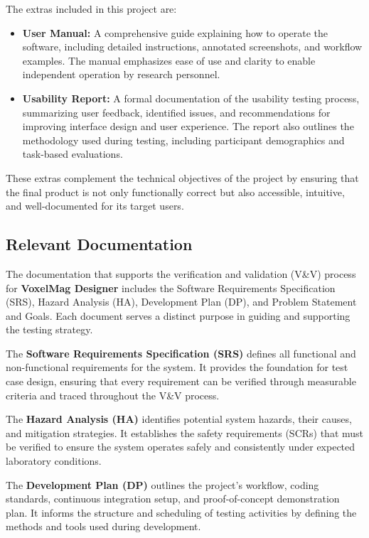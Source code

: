 \documentclass[12pt, titlepage]{article}
\begin{document}
The extras included in this project are:

\begin{itemize}
  \item \textbf{User Manual:} A comprehensive guide explaining how to operate the software, including detailed instructions, annotated screenshots, and workflow examples. The manual emphasizes ease of use and clarity to enable independent operation by research personnel.
  \item \textbf{Usability Report:} A formal documentation of the usability testing process, summarizing user feedback, identified issues, and recommendations for improving interface design and user experience. The report also outlines the methodology used during testing, including participant demographics and task-based evaluations.
\end{itemize}

These extras complement the technical objectives of the project by ensuring that the final product is not only functionally correct but also accessible, intuitive, and well-documented for its target users.

\subsection{Relevant Documentation}



\citet{SRS}

The documentation that supports the verification and validation (V\&V) process for \textbf{VoxelMag Designer} includes the Software Requirements Specification (SRS), Hazard Analysis (HA), Development Plan (DP), and Problem Statement and Goals. Each document serves a distinct purpose in guiding and supporting the testing strategy.

The \textbf{Software Requirements Specification (SRS)} defines all functional and non-functional requirements for the system. It provides the foundation for test case design, ensuring that every requirement can be verified through measurable criteria and traced throughout the V\&V process.

The \textbf{Hazard Analysis (HA)} identifies potential system hazards, their causes, and mitigation strategies. It establishes the safety requirements (SCRs) that must be verified to ensure the system operates safely and consistently under expected laboratory conditions.

The \textbf{Development Plan (DP)} outlines the project’s workflow, coding standards, continuous integration setup, and proof-of-concept demonstration plan. It informs the structure and scheduling of testing activities by defining the methods and tools used during development.
\end{document}
